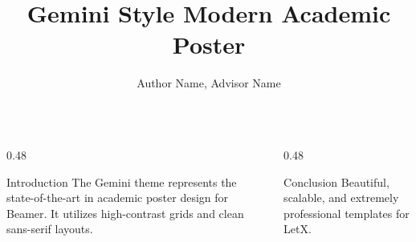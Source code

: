 \documentclass{beamer}
\title{Gemini Style Modern Academic Poster}
\author{Author Name, Advisor Name}
\institute{CSE Department, Academic Lab}
\begin{document}
\begin{frame}[t]
  \maketitle
  
  \begin{columns}[t]
    \begin{column}{0.48\textwidth}
      \begin{block}{Introduction}
        The Gemini theme represents the state-of-the-art in academic poster design for Beamer. It utilizes high-contrast grids and clean sans-serif layouts.
      \end{block}
    \end{column}
    
    \begin{column}{0.48\textwidth}
      \begin{block}{Conclusion}
        Beautiful, scalable, and extremely professional templates for LetX.
      \end{block}
    \end{column}
  \end{columns}
\end{frame}
\end{document}
